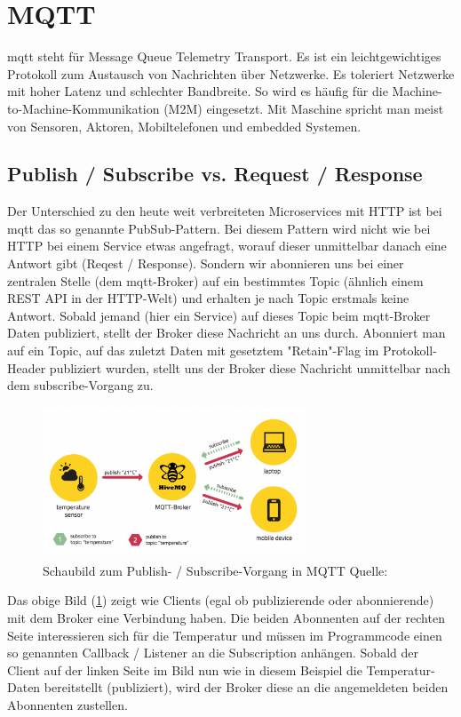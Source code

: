\section{MQTT}
\label{sec:mqtt}
\acrshort{mqtt} steht für Message Queue Telemetry Transport. Es ist ein leichtgewichtiges Protokoll zum Austausch von Nachrichten über Netzwerke. Es toleriert Netzwerke mit hoher Latenz und schlechter Bandbreite. So wird es häufig für die Machine-to-Machine-Kommunikation (M2M) eingesetzt. Mit Maschine spricht man meist von Sensoren, Aktoren, Mobiltelefonen und embedded Systemen.

\subsection{Publish / Subscribe vs. Request / Response}
\label{sec:publish-subscribe}
Der Unterschied zu den heute weit verbreiteten Microservices mit HTTP ist bei \acrshort{mqtt} das so genannte PubSub-Pattern. Bei diesem Pattern wird nicht wie bei HTTP bei einem Service etwas angefragt, worauf dieser unmittelbar danach eine Antwort gibt (Reqest / Response). Sondern wir abonnieren uns bei einer zentralen Stelle (dem \acrshort{mqtt}-Broker) auf ein bestimmtes Topic (ähnlich einem REST API in der HTTP-Welt) und erhalten je nach Topic erstmals keine Antwort. Sobald jemand (hier ein Service) auf dieses Topic beim \acrshort{mqtt}-Broker Daten publiziert, stellt der Broker diese Nachricht an uns durch. Abonniert man auf ein Topic, auf das zuletzt Daten mit gesetztem "Retain"-Flag im Protokoll-Header publiziert wurden, stellt uns der Broker diese Nachricht unmittelbar nach dem subscribe-Vorgang zu.
\begin{figure}[H]
	\centering
	\includegraphics[width=0.7\textwidth]{img/mqtt-basics-by_hivemq.png}
	\caption{Schaubild zum Publish- / Subscribe-Vorgang in MQTT Quelle: \cite{hivemq.com-mqtt-essentials-publish-subscribe}}
	\label{fig:pubsub-example}
\end{figure}
Das obige Bild (\ref{fig:pubsub-example}) zeigt wie Clients (egal ob publizierende oder abonnierende) mit dem Broker eine Verbindung haben. Die beiden Abonnenten auf der rechten Seite interessieren sich für die Temperatur und müssen im Programmcode einen so genannten Callback / Listener an die Subscription anhängen. Sobald der Client auf der linken Seite im Bild nun wie in diesem Beispiel die Temperatur-Daten bereitstellt (publiziert), wird der Broker diese an die angemeldeten beiden Abonnenten zustellen.

